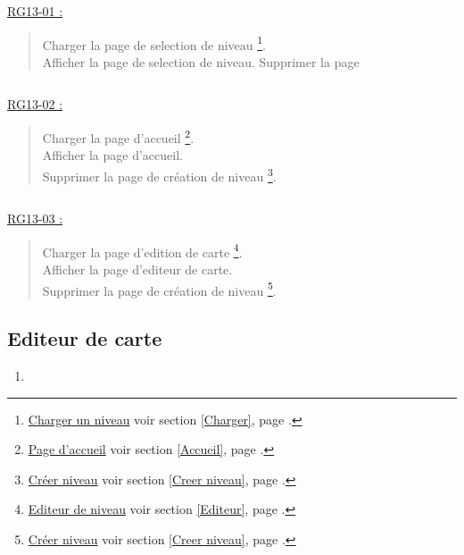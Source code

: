 \documentclass{report}
\begin{document}
			\underline{RG13-01 :}
				\begin{quote}
					Charger la page de selection de niveau%
						\footnote[1]{
							\hyperlink{Charger un niveau}{Charger un niveau}
							\og voir section \ref{Charger}, page \pageref{Charger}.\fg
						}.\\
					Afficher la page de selection de niveau\footnotemark[1].
					Supprimer la page
				\end{quote}
				
			$\,$

			\underline{RG13-02 :}
				\begin{quote}
					Charger la page d'accueil%
						\footnote[2]{
							\hyperlink{Page d'accueil}{Page d'accueil}
							\og voir section \ref{Accueil}, page \pageref{Accueil}.\fg
						}.\\
					Afficher la page d'accueil\footnotemark[2].\\
					Supprimer la page de création de niveau%
					\footnote[3]{
						\hyperlink{Creer niveau}{Créer niveau}
						\og voir section \ref{Creer niveau}, page \pageref{Creer niveau}.\fg
					}.
				\end{quote}
				
			$\,$
			
			\underline{RG13-03 :}
				\begin{quote}
					Charger la page d'edition de carte%
					\footnote[2]{
							\hyperlink{Editeur}{Editeur de niveau}
							\og voir section \ref{Editeur}, page \pageref{Editeur}.\fg
						}.\\
					Afficher la page d'editeur de carte\footnotemark[2].\\
					Supprimer la page de création de niveau%
					\footnote[3]{
						\hyperlink{Creer niveau}{Créer niveau}
						\og voir section \ref{Creer niveau}, page \pageref{Creer niveau}.\fg
					}.
				\end{quote}
				
				
\newpage

	\subsection{Editeur de carte}
		
		\hypertarget{Editeur de carte}{}
		\label{Editeur de carte}
			
		\begin{center}
			
		\end{center}
		
		\begin{enumerate}
		  \item 
		\end{enumerate}
\end{document}
